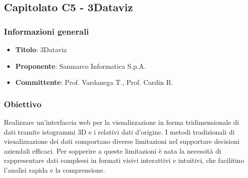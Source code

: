 \subsection{Capitolato C5 - 3Dataviz}
    \subsubsection{Informazioni generali}
        \begin{itemize}
            \item \textbf{Titolo}: 3Dataviz
            \item \textbf{Proponente}: Sanmarco Informatica S.p.A.
            \item \textbf{Committente}: Prof. Vardanega T., Prof. Cardin R.
        \end{itemize}
    \subsubsection{Obiettivo}
        Realizzare un’interfaccia web per la visualizzazione in forma tridimensionale di dati tramite istogrammi 3D e i relativi dati d’origine.
        I metodi tradizionali di visualizzazione dei dati comportano diverse limitazioni nel supportare decisioni aziendali efficaci. Per sopperire a queste limitazioni è nata la necessità di rappresentare dati complessi in formati visivi interattivi e intuitivi, che facilitino l’analisi rapida e la comprensione.
